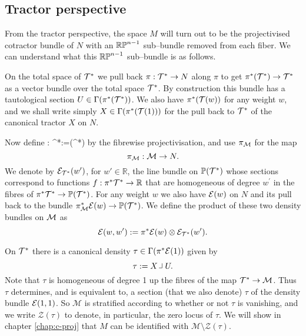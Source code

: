 


\subsection{Tractor perspective} \label{sec:trac_construction}

From the tractor perspective, the space $M$ will turn out to be the projectivised cotractor bundle of $N$ with an $\mathbb{RP}^{n-1}$ sub--bundle removed from each fiber. We can understand what this $\mathbb{RP}^{n-1}$ sub--bundle is as follows.

On the total space of $\mathcal{T}^*$ we pull back $\pi:\mathcal{T}^*\to N$ along $\pi$ to get $\pi^*(\mathcal{T}^*)\to \mathcal{T}^*$ as a vector bundle over the total space $\mathcal{T}^*$. By construction this bundle has a tautological section $U\in \Gamma (\pi^*(\mathcal{T}^*))$.  We also have $\pi^*(\mathcal{T}(w))$ for any weight $w$, and we shall write simply $X\in \Gamma(\pi^*(\mathcal{T}(1)))$ for the pull back to $\mathcal{T}^*$ of the canonical tractor $X$ on $N$.

Now define
\be
\label{projection_map}
\kappa: \cT^*\longrightarrow {}:=(\cT^*)
\ee
by the fibrewise projectivisation, and use $\pi_{\mathcal{M}}$ for the map
$$
\pi_{\mathcal{M}}:\mathcal{M}\to N.
$$
We denote by $\mathcal{E}_{\mathcal{T}^*}(w')$, for $w'\in \mathbb{R}$, the line
bundle on $\mathbb{P}(\mathcal{T}^*)$ whose sections correspond to functions
$f: \pi^*\mathcal{T}^* \to\mathbb{R} $ that are homogeneous of degree $w^\prime$ in
the fibres of $\pi^*\mathcal{T}^*\to \mathbb{P}(\mathcal{T}^*)$. For any weight $w$ we also have $\mathcal{E}(w)$ on $N$ and its pull back to the bundle $\pi_{\mathcal{M}}^*\mathcal{E}(w)\to \mathbb{P}(\mathcal{T}^*)$.
We define the product of these two density bundles on $\mathcal{M}$ as
$$
\mathcal{E}(w,w'):= \pi^*\mathcal{E}(w) \otimes \mathcal{E}_{\mathcal{T}^*}(w').
$$

On $\mathcal{T}^*$ there is  a canonical density $\tau\in \Gamma(\pi^*\mathcal{E}(1))$ given by
$$
\tau:= X\hook U .
$$
Note that $\tau$ is homogeneous of degree 1 up the fibres of the
map $\mathcal{T}^*\to \mathcal{M}$. Thus $\tau$ determines, and is equivalent
to, a section (that we also denote) $\tau$ of the density bundle $\mathcal{E}(1,1)$. So $\mathcal{M}$ is stratified according to
whether or not $\tau$ is vanishing, and we write $\mathcal{Z}(\tau)$
to denote, in particular, the zero locus of $\tau$. We will show in chapter \ref{chap:c-proj} that $M$ can be identified with $\mathcal{M}\setminus \mathcal{Z}(\tau)$.

